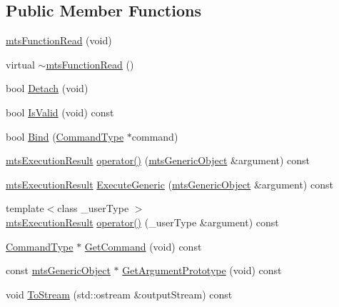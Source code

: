 \subsection*{Public Member Functions}
\begin{DoxyCompactItemize}
\item 
\hyperlink{classmts_function_read_ae791f29d3c9f2693ceb78bd71fa3d4fb}{mts\+Function\+Read} (void)
\item 
virtual \hyperlink{classmts_function_read_ad6186a1cc7dc8a6421614f1ad5b3e5bb}{$\sim$mts\+Function\+Read} ()
\item 
bool \hyperlink{classmts_function_read_a2699ffdba2c35a0ab4d4523087a54388}{Detach} (void)
\item 
bool \hyperlink{classmts_function_read_a7db527fe7b6259077e7f430a02aaf663}{Is\+Valid} (void) const 
\item 
bool \hyperlink{classmts_function_read_a72de23edef8c36bb005c4e3aee3f7ba3}{Bind} (\hyperlink{classmts_function_read_ac29fb3db043f94da5d51fe37860b1015}{Command\+Type} $\ast$command)
\item 
\hyperlink{classmts_execution_result}{mts\+Execution\+Result} \hyperlink{classmts_function_read_ac3935ec6461023a8c050360dbb38e502}{operator()} (\hyperlink{classmts_generic_object}{mts\+Generic\+Object} \&argument) const 
\item 
\hyperlink{classmts_execution_result}{mts\+Execution\+Result} \hyperlink{classmts_function_read_aaa874a5d2a1e8b611b4b4e598dccb710}{Execute\+Generic} (\hyperlink{classmts_generic_object}{mts\+Generic\+Object} \&argument) const 
\item 
{\footnotesize template$<$class \+\_\+user\+Type $>$ }\\\hyperlink{classmts_execution_result}{mts\+Execution\+Result} \hyperlink{classmts_function_read_afcef5572de1b1a9b5beb221368e10cb9}{operator()} (\+\_\+user\+Type \&argument) const 
\item 
\hyperlink{classmts_function_read_ac29fb3db043f94da5d51fe37860b1015}{Command\+Type} $\ast$ \hyperlink{classmts_function_read_a51014fa5c58bf17f256de7d9ad89771d}{Get\+Command} (void) const 
\item 
const \hyperlink{classmts_generic_object}{mts\+Generic\+Object} $\ast$ \hyperlink{classmts_function_read_a4473bcdb760ef64ba50e70a8e8d261d6}{Get\+Argument\+Prototype} (void) const 
\item 
void \hyperlink{classmts_function_read_a41f1739c5fbdaa2ccc8f46e806234f22}{To\+Stream} (std\+::ostream \&output\+Stream) const 
\end{DoxyCompactItemize}
